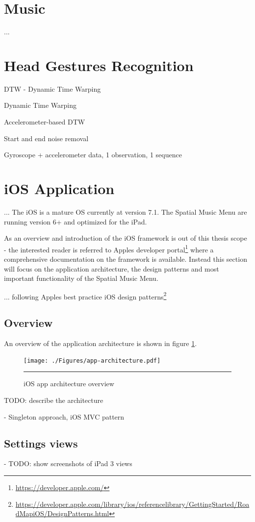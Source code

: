 \section{Music}
...

\subsection{}


\section{Head Gestures Recognition}

DTW - Dynamic Time Warping 

Dynamic Time Warping \cite{salvador_toward_2007}

Accelerometer-based DTW \cite{akl_accelerometer-based_2010}

Start and end noise removal

Gyroscope + accelerometer data, 1 observation, 1 sequence


\section{iOS Application}
...
The iOS is a mature OS currently at version 7.1. The Spatial Music Menu are running version 6+ and optimized for the iPad.

As an overview and introduction of the iOS framework is out of this thesis scope - the interested reader is referred to Apples developer portal\footnote{\url{https://developer.apple.com/}} where a comprehensive documentation on the framework is available. Instead this section will focus on the application architecture, the design patterns and most important functionality of the Spatial Music Menu.

... following Apples best practice iOS design patterns\footnote{\url{https://developer.apple.com/library/ios/referencelibrary/GettingStarted/RoadMapiOS/DesignPatterns.html}}

\subsection{Overview}
An overview of the application architecture is shown in figure \ref{fig:apparchitecture}.

\begin{figure}[htbp]
	\centering
		\texttt{[image: ./Figures/app-architecture.pdf]}
		\rule{35em}{1pt}
	\caption[App architecture]{iOS app architecture overview}
	\label{fig:apparchitecture}
\end{figure}

TODO: describe the architecture

- Singleton approach, iOS MVC pattern

\subsection{Settings views}
- TODO: show screenshots of iPad 3 views








